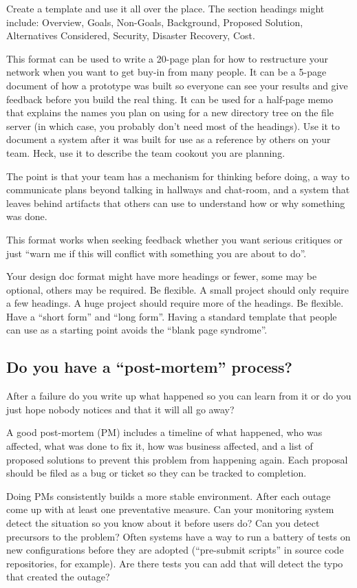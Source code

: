 \documentclass{article}
\begin{document}
Create a template and use it all over the place. The section headings might include: Overview, Goals, Non-Goals, Background, Proposed Solution, Alternatives Considered, Security, Disaster Recovery, Cost.

This format can be used to write a 20-page plan for how to restructure your network when you want to get buy-in from many people. It can be a 5-page document of how a prototype was built so everyone can see your results and give feedback before you build the real thing. It can be used for a half-page memo that explains the names you plan on using for a new directory tree on the file server (in which case, you probably don't need most of the headings). Use it to document a system after it was built for use as a reference by others on your team. Heck, use it to describe the team cookout you are planning.

The point is that your team has a mechanism for thinking before doing, a way to communicate plans beyond talking in hallways and chat-room, and a system that leaves behind artifacts that others can use to understand how or why something was done.

This format works when seeking feedback whether you want serious critiques or just ``warn me if this will conflict with something you are about to do''.

Your design doc format might have more headings or fewer, some may be optional, others may be required. Be flexible. A small project should only require a few headings. A huge project should require more of the headings. Be flexible. Have a ``short form'' and ``long form''. Having a standard template that people can use as a starting point avoids the ``blank page syndrome''.

\subsection{Do you have a ``post-mortem'' process?}
After a failure do you write up what happened so you can learn from it or do you just hope nobody notices and that it will all go away?

A good post-mortem (PM) includes a timeline of what happened, who was affected, what was done to fix it, how was business affected, and a list of proposed solutions to prevent this problem from happening again. Each proposal should be filed as a bug or ticket so they can be tracked to completion.

Doing PMs consistently builds a more stable environment. After each outage come up with at least one preventative measure. Can your monitoring system detect the situation so you know about it before users do? Can you detect precursors to the problem? Often systems have a way to run a battery of tests on new configurations before they are adopted (``pre-submit scripts'' in source code repositories, for example). Are there tests you can add that will detect the typo that created the outage?
\end{document}
